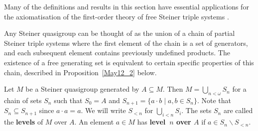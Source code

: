 \documentclass[a4paper, 11pt]{article}
\theoremstyle{note}
\begin{document}
Many of the definitions and results in this section  have essential applications for the axiomatisation of the first-order theory of free Steiner triple systems \cite{barcas3}. 
	
Any Steiner quasigroup can be thought of as the union of a chain of partial Steiner triple systems where the first element of the chain is a set of generators, and each subsequent element contains previously undefined products. The existence of a free generating set is equivalent to certain specific properties of this chain, described in Proposition~\ref{May12_2} below.

 Let $M$ be a Steiner quasigroup generated by $A\subseteq M$.  Then  $M=\bigcup_{n<\omega} S_n$ for a chain of sets $S_n$ such that  $S_0 =A$ and $S_{n+1}= \{a\cdot b\mid a,b\in S_n\}$. Note that $S_n\subseteq S_{n+1}$  since  $a\cdot a = a$.
 We will write $S_{<n}$ for $\bigcup_{i<n} S_i$. 
	 The sets $S_n$  are called the \textbf{levels} of $M$ over $A$. An element $a\in M$ has   \textbf{level~$n$ over $A$}  if $a\in S_n\smallsetminus S_{<n}$.
	
	
	
\end{document}
